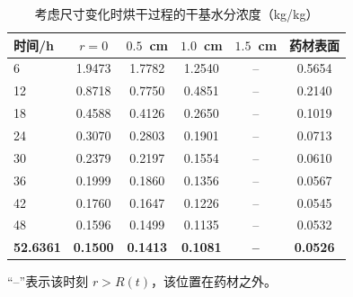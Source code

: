 \begin{table}[H]
  \centering
  \caption{考虑尺寸变化时烘干过程的干基水分浓度（kg/kg）}
  \label{tab:table6_q4}
  \small
  \begin{tabular}{lccccc}
    \toprule
    时间/h & $r=0$ & $0.5$~cm & $1.0$~cm & $1.5$~cm & 药材表面 \\
    \midrule
    6 & 1.9473 & 1.7782 & 1.2540 & -- & 0.5654 \\
    12 & 0.8718 & 0.7750 & 0.4851 & -- & 0.2140 \\
    18 & 0.4588 & 0.4126 & 0.2650 & -- & 0.1019 \\
    24 & 0.3070 & 0.2803 & 0.1901 & -- & 0.0713 \\
    30 & 0.2379 & 0.2197 & 0.1554 & -- & 0.0610 \\
    36 & 0.1999 & 0.1860 & 0.1356 & -- & 0.0567 \\
    42 & 0.1760 & 0.1647 & 0.1226 & -- & 0.0545 \\
    48 & 0.1596 & 0.1499 & 0.1135 & -- & 0.0532 \\
    \textbf{52.6361} & \textbf{0.1500} & \textbf{0.1413} & \textbf{0.1081} & \textbf{--} & \textbf{0.0526} \\
    \bottomrule
  \end{tabular}
  \par\smallskip\footnotesize “--”表示该时刻 $r>R(t)$，该位置在药材之外。
\end{table}
